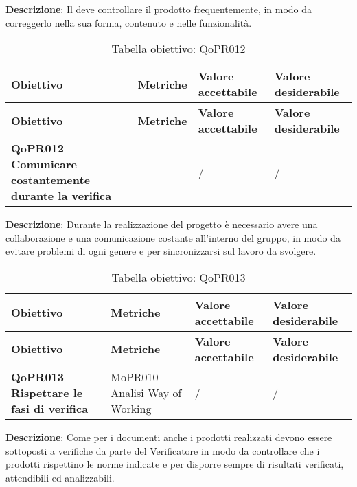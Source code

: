 \documentclass[../piano-di-qualifica.tex]{subfiles}
\begin{document}
        \textbf{Descrizione}: Il  deve controllare il prodotto frequentemente, in modo da correggerlo nella sua forma, contenuto e nelle funzionalità.
        
        \renewcommand{\arraystretch}{2} %
        \begin{longtable}[H]{>{\centering\bfseries}m{5cm} >{\centering}m{5cm} >{\centering}m{2.5cm} >{\centering\arraybackslash}m{2.5cm}}  
            \caption{Tabella obiettivo: QoPR012}%
            \label{tab:requisiti_funzionali} \\
          \rowcolor{lightgray}
          {\textbf{Obiettivo}} & {\textbf{Metriche}} & {\textbf{Valore accettabile}} & {\textbf{Valore desiderabile}}  \\
          \endfirsthead%
          \rowcolor{lightgray}
          {\textbf{Obiettivo}} & {\textbf{Metriche}} & {\textbf{Valore accettabile}} & {\textbf{Valore desiderabile}}  \\
          \endhead%
          \textbf{QoPR012 Comunicare costantemente durante la verifica} &  & / & / \\
        \end{longtable}
        
        \textbf{Descrizione}: Durante la realizzazione del progetto è necessario avere una collaborazione e una comunicazione costante all'interno del gruppo, in modo da evitare problemi di ogni genere e per sincronizzarsi sul lavoro da svolgere.
        
        \renewcommand{\arraystretch}{2} %
        \begin{longtable}[H]{>{\centering\bfseries}m{5cm} >{\centering}m{5cm} >{\centering}m{2.5cm} >{\centering\arraybackslash}m{2.5cm}}  
            \caption{Tabella obiettivo: QoPR013}%
            \label{tab:requisiti_funzionali} \\
          \rowcolor{lightgray}
          {\textbf{Obiettivo}} & {\textbf{Metriche}} & {\textbf{Valore accettabile}} & {\textbf{Valore desiderabile}}  \\
          \endfirsthead%
          \rowcolor{lightgray}
          {\textbf{Obiettivo}} & {\textbf{Metriche}} & {\textbf{Valore accettabile}} & {\textbf{Valore desiderabile}}  \\
          \endhead%
          \textbf{QoPR013 Rispettare le fasi di verifica} & MoPR010 Analisi Way of Working & / & / \\
        \end{longtable}
        
        \textbf{Descrizione}: Come per i documenti anche i prodotti realizzati devono essere sottoposti a verifiche da parte del Verificatore in modo da controllare che i prodotti rispettino le norme indicate e per disporre sempre di risultati verificati, attendibili ed analizzabili.
        
\end{document}
